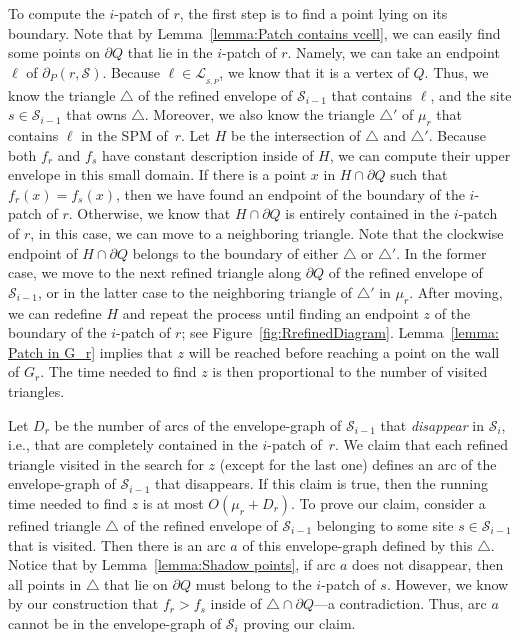 \documentclass[a4paper,UKenglish]{socg-lipics-v2018}
\newcommand{\icell}[1][i]{${#1}$-patch\xspace}
\newcommand{\s}{\mathcal S}
\newcommand{\bcell}[2][P]{\ensuremath{\partial_{\scriptscriptstyle #1}(#2)}}
\newcommand{\LL}[1][\s, P]{\ensuremath{\mathcal L_{_{#1}}}}
\begin{document}
To compute the \icell of $r$, the first step is to find a point lying on its boundary.
Note that by Lemma~\ref{lemma:Patch contains vcell}, we can easily find some points on $\partial Q$ that lie in the \icell of $r$.
Namely, we can take an endpoint $\ell$ of $\bcell{r, \s}$. 
Because $\ell\in \LL$, we know that it is a vertex of $Q$.
Thus, we know the triangle $\triangle$ of the refined envelope of $\s_{i-1}$ that contains $\ell$, and the site $s\in \s_{i-1}$ that owns $\triangle$.
Moreover, we also know the triangle $\triangle'$ of $\mu_r$ that contains $\ell$ in the SPM of~$r$.
Let $H$ be the intersection of $\triangle$ and $\triangle'$.
Because both $f_r$ and $f_s$ have constant description inside of $H$, we can compute their upper envelope in this small domain.
If there is a point $x$ in $H\cap \partial Q$ such that $f_r(x) = f_s(x)$, then we have found an endpoint of the boundary of the \icell of $r$.
Otherwise, we know that $H\cap \partial Q$ is entirely contained in the \icell of $r$, in this case, we can move to a neighboring triangle.
Note that the clockwise endpoint of $H\cap \partial Q$ belongs to the boundary of either $\triangle$ or $\triangle'$. 
In the former case, we move to the next refined triangle along $\partial Q$ of the refined envelope of $\s_{i-1}$, 
or in the latter case to the neighboring triangle of $\triangle'$ in $\mu_r$.
After moving, we can redefine $H$ and repeat the process until finding an endpoint $z$ of the boundary of the \icell of $r$; see Figure~\ref{fig:RrefinedDiagram}. 
Lemma~\ref{lemma: Patch in G_r} implies that $z$ will be reached before reaching a point on the wall of $G_r$.
The time needed to find $z$ is then proportional to the number of visited triangles. 

Let $D_r$ be the number of arcs of the envelope-graph of $\s_{i-1}$ that \emph{disappear} in $\s_i$, i.e., that are completely contained in the \icell of~$r$.
We claim that each refined triangle visited in the search for $z$ (except for the last one) defines an arc of  the  envelope-graph of $\s_{i-1}$ that disappears. 
If this claim is true, then the running time needed to find $z$ is at most $O(\mu_r + D_r)$.
To prove our claim, consider a refined triangle $\triangle$ of the refined envelope of $\s_{i-1}$ belonging to some site $s\in \s_{i-1}$ that is visited. 
Then there is an arc $a$ of this envelope-graph defined by this $\triangle$. 
Notice that by Lemma~\ref{lemma:Shadow points}, if arc $a$ does not disappear, then all points in $\triangle$ that lie on $\partial Q$ must belong to the \icell of $s$. 
However, we know by our construction that $f_r > f_s$ inside of $\triangle\cap \partial Q$---a contradiction. 
Thus, arc $a$ cannot be in the envelope-graph of $\s_i$ proving our claim. 
\end{document}
